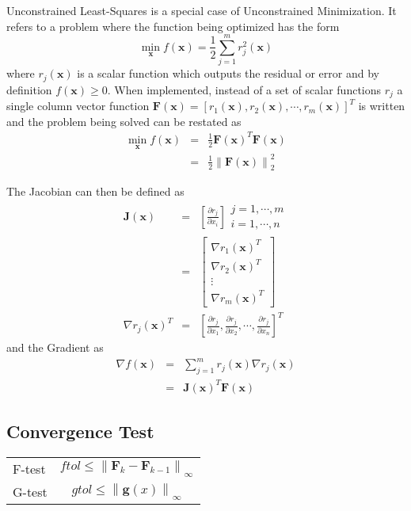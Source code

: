 \documentclass[peerreview,onecolumn]{IEEEtran}
\newcommand{\norm}[1]{\left\lVert#1\right\rVert}
\begin{document}
Unconstrained Least-Squares is a special case of Unconstrained Minimization. It refers to a problem where the function being optimized has the form
\begin{equation}
\min\limits_{\bm{x}} f(\bm{x})=\frac{1}{2}\sum^m_{j=1} r^2_j(\bm{x})
\end{equation}
where $r_j(\bm{x})$ is a scalar function which outputs the residual or error and by definition $f(\bm{x}) \ge 0$. When implemented, instead of a set of scalar functions $r_j$ a single column vector function $\bm{F}(\bm{x}) = [ r_1(\bm{x}) , r_2(\bm{x}) , \cdots , r_m(\bm{x}) ]^T$ is written and the problem being solved can be restated as
\begin{eqnarray}
\min\limits_{\bm{x}} f(\bm{x})&=&\frac{1}{2} \bm{F}(\bm{x})^T \bm{F}(\bm{x})\\
&=& \frac{1}{2} \norm{\bm{F}(\bm{x})}^2_2
\end{eqnarray}

The Jacobian can then be defined as
\begin{eqnarray}
\bm{J}(\bm{x}) &=& \left[\frac{\partial r_j}{\partial x_i}\right]\begin{array}{l}j=1,\cdots,m\\i=1,\cdots,n \end{array} \\
&=& \left[ \begin{array}{c}\nabla r_1(\bm{x})^T \\ \nabla r_2(\bm{x})^T \\ \vdots \\ \nabla r_m(\bm{x})^T \end{array}\right] \\
\nabla r_j(\bm{x})^T &=& \left[ \frac{\partial r_j}{\partial x_1},\frac{\partial r_j}{\partial x_2}, \cdots , \frac{\partial r_j}{\partial x_n} \right]^T
\end{eqnarray}
and the Gradient as
\begin{eqnarray}
\nabla f(\bm{x}) &=& \sum^m_{j=1}r_j(\bm{x})\nabla r_j(\bm{x}) \\
&=& \bm{J}(\bm{x})^T \bm{F}(\bm{x})
\end{eqnarray}

\subsection{Convergence Test}
\begin{center}
\begin{tabular}{lc}
F-test & $ftol \leq \norm{\bm{F}_k-\bm{F}_{k-1}}_\infty$ \\
G-test & $gtol \leq \norm{\bm{g}(x)}_\infty$ \\
\end{tabular}
\end{center}
\end{document}
